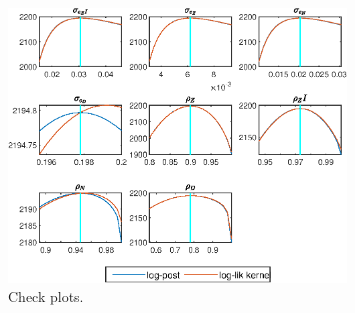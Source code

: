  
\begin{figure}[H]
\centering 
\includegraphics[width=0.80\textwidth]{BRS/graphs/BRS_CheckPlots1}
\caption{Check plots.}\label{Fig:CheckPlots:1}
\end{figure}
 
